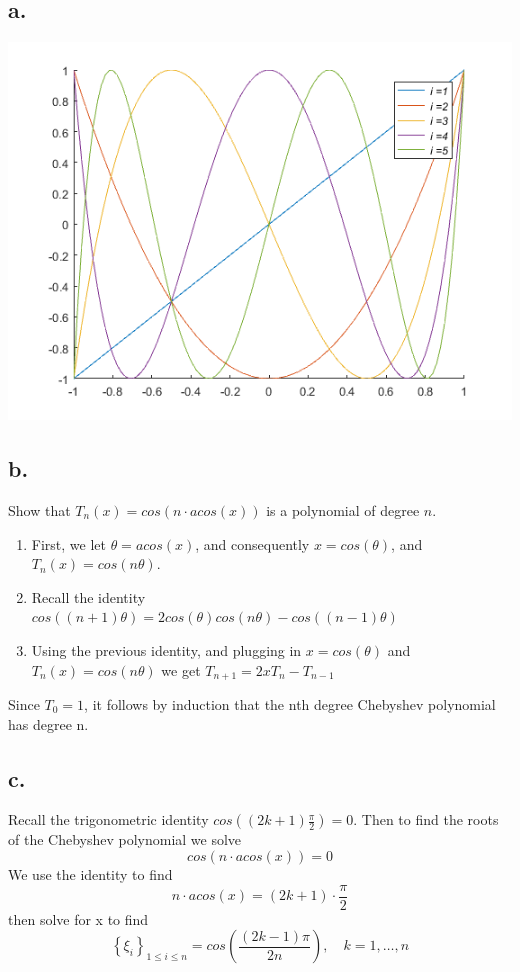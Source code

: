 \documentclass{article}
\begin{document}
\subsection*{a.}
\begin{center}
  \includegraphics[width=0.7
    \textwidth]{figures/question3}
\end{center}
\subsection*{b.}
Show that \(T_n(x)=cos(n\cdot acos(x))\) is a polynomial of degree
\(n\).
\begin{enumerate}
\item First, we let \(\theta=acos(x)\), and consequently
  \(x=cos(\theta)\), and \(T_n(x)=cos(n\theta)\).
  \item Recall the identity
    \(cos\left((n+1)\theta\right)=2cos(\theta)cos(n\theta)-cos\left((n-1)\theta\right)\)
\item Using the previous identity, and plugging in \(x=cos(\theta)\)
  and \(T_n(x)=cos(n\theta)\) we get
  \(T_{n+1}=2xT_n -T_{n-1}\)
\end{enumerate}
Since \(T_0=1\), it follows by induction that the nth degree Chebyshev
polynomial has degree n.
\subsection*{c.}
Recall the trigonometric identity
\(cos\left((2k+1)\frac{\pi}{2}\right)=0\). Then to find the roots of
the Chebyshev polynomial we solve
\[cos\left(n\cdot acos(x)\right)=0\]
We use the identity to find
\[n\cdot acos(x) = (2k+1)\cdot\frac{\pi}{2}\]
then solve for x to find
\[\left\{\xi_i\right\}_{1\leq i\leq n}=cos\left(\frac{(2k-1)\pi}{2n}\right),\quad k=1,\dots,n\]


\pagebreak
\section{}
\end{document}
